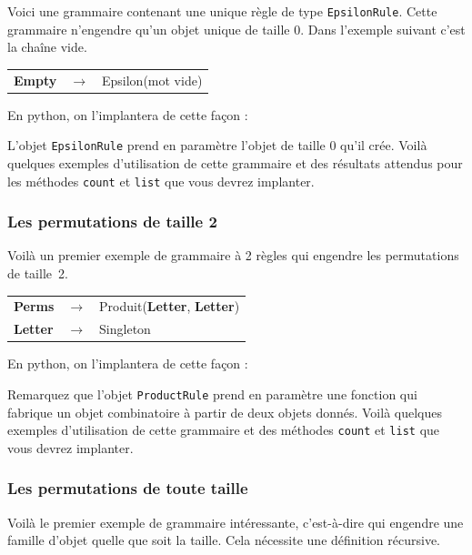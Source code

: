 \documentclass[11pt]{article}
\newcommand{\EpsilonRule}{\texttt{EpsilonRule}\xspace}
\newcommand{\ProductRule}{\texttt{ProductRule}\xspace}
\newcommand{\cnt}{\texttt{count}\xspace}
\newcommand{\lst}{\texttt{list}\xspace}
\begin{document}
Voici une grammaire contenant une unique règle de type \EpsilonRule. Cette
grammaire n'engendre qu'un objet unique de taille 0. Dans l'exemple suivant
c'est la chaîne vide.

\begin{tabular}{lll}
\textbf{Empty} & $\rightarrow$ & Epsilon(mot vide)
\end{tabular}

En python, on l'implantera de cette façon :



L'objet \EpsilonRule prend en paramètre l'objet de taille 0 qu'il crée. Voilà
quelques exemples d'utilisation de cette grammaire et des résultats attendus
pour les méthodes \cnt et \lst que vous devrez implanter.



\subsubsection{Les permutations de taille 2}

Voilà un premier exemple de grammaire à 2 règles qui engendre les permutations
de taille~2.

\begin{tabular}{lll}
\textbf{Perms} & $\rightarrow$ & Produit(\textbf{Letter}, \textbf{Letter}) \\
\textbf{Letter} & $\rightarrow$ & Singleton
\end{tabular}

En python, on l'implantera de cette façon :



Remarquez que l'objet \ProductRule prend en paramètre une fonction qui
fabrique un objet combinatoire à partir de deux objets donnés. Voilà quelques
exemples d'utilisation de cette grammaire et des méthodes \cnt et \lst que
vous devrez implanter.



\subsubsection{Les permutations de toute taille}

Voilà le premier exemple de grammaire intéressante, c'est-à-dire qui engendre
une famille d'objet quelle que soit la taille. Cela nécessite une définition récursive.
\end{document}

